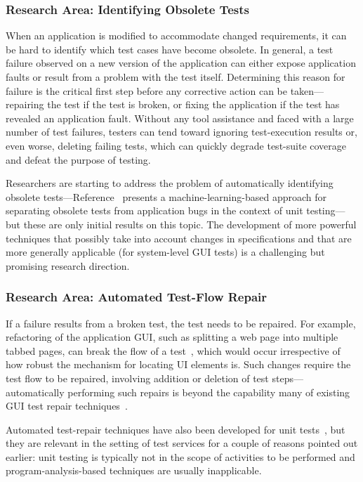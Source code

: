 \subsubsection*{Research Area: Identifying Obsolete Tests}

When an application is modified to accommodate changed requirements, it can be
hard to identify which test cases have become obsolete.  In general, a test
failure observed on a new version of the application can either expose
application faults or result from a problem with the test itself. Determining
this reason for failure is the critical first step before any corrective action
can be taken---repairing the test if the test is broken, or fixing the
application if the test has revealed an application fault. Without any tool
assistance and faced with a large number of test failures, testers can tend
toward ignoring test-execution results or, even worse, deleting failing tests,
which can quickly degrade test-suite coverage and defeat the purpose of testing.

Researchers are starting to address the problem of automatically identifying
obsolete tests---\eg Reference~\cite{Hao:2013} presents a machine-learning-based
approach for separating obsolete tests from application bugs in the context of
unit testing---but these are only initial results on this topic. The development
of more powerful techniques that possibly take into account changes in
specifications and that are more generally applicable (\eg for system-level GUI
tests) is a challenging but promising research direction.

\subsubsection*{Research Area: Automated Test-Flow Repair}

If a failure results from a broken test, the test needs to be repaired.  For
example, refactoring of the application GUI, such as splitting a web page into
multiple tabbed pages, can break the flow of a test~\cite{thummalapenta:2013a},
which would occur irrespective of how robust the mechanism for locating UI
elements is. Such changes require the test flow to be repaired, involving
addition or deletion of test steps---automatically performing such repairs is
beyond the capability many of existing GUI test repair
techniques~\cite{Choudhary:2011, Grechanik:2009, Memon:2008}.

Automated test-repair techniques have also been developed for unit
tests~\cite{Daniel:2009, Daniel:2010, Mirzaaghaei:2012}, but they are relevant
in the setting of test services for a couple of reasons pointed out earlier:
unit testing is typically not in the scope of activities to be performed and
program-analysis-based techniques are usually inapplicable.

